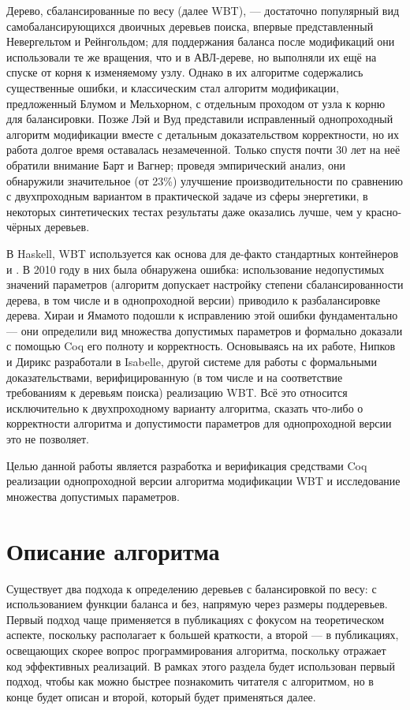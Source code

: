 \documentclass[a4paper,14pt]{extarticle}
\begin{document}
Дерево, сбалансированные по весу (далее WBT), --- достаточно популярный вид
самобалансирующихся двоичных деревьев поиска,
впервые представленный Невергельтом и Рейнгольдом\cite{nievergelt};
для поддержания баланса после модификаций они использовали
те же вращения, что и в АВЛ-дереве\cite{avl},
но выполняли их ещё на спуске от корня к изменяемому узлу.
Однако в их алгоритме содержались существенные ошибки,
и классическим стал алгоритм модификации,
предложенный Блумом и Мельхорном\cite{blum},
с отдельным проходом от узла к корню для балансировки.
Позже Лэй и Вуд представили исправленный
однопроходный алгоритм модификации
вместе с детальным доказательством корректности\cite{lai},
но их работа долгое время оставалась незамеченной.
Только спустя почти 30 лет на неё обратили внимание
Барт и Вагнер;
проведя эмпирический анализ, они обнаружили
значительное (от 23\%) улучшение производительности
по сравнению с двухпроходным вариантом в практической задаче из сферы энергетики,
в некоторых синтетических тестах
результаты даже оказались лучше, чем у красно-чёрных деревьев\cite{barth}.

В Haskell, WBT используется как основа для
де-факто стандартных контейнеров  и .
В 2010 году в них была обнаружена ошибка:
использование недопустимых значений параметров
(алгоритм допускает настройку степени сбалансированности дерева,
в том числе и в однопроходной версии)
приводило к разбалансировке дерева.
Хираи и Ямамото подошли к исправлению этой ошибки фундаментально ---
они определили вид множества допустимых параметров
и формально доказали с помощью Coq его полноту и корректность\cite{hirai}.
Основываясь на их работе,
Нипков и Дирикс разработали в Isabelle,
другой системе для работы с формальными доказательствами,
верифицированную (в том числе и на соответствие требованиям к деревьям поиска)
реализацию WBT\cite{nipkow}.
Всё это относится исключительно
к двухпроходному варианту алгоритма,
сказать что-либо о корректности алгоритма и допустимости параметров
для однопроходной версии это не позволяет.

Целью данной работы является
разработка и верификация средствами Coq
реализации однопроходной версии алгоритма модификации WBT
и исследование множества допустимых параметров.

\clearpage
\section{Описание алгоритма}

Существует два подхода
к определению деревьев с балансировкой по весу:
с использованием функции баланса и
без, напрямую через размеры поддеревьев.
Первый подход чаще
применяется в публикациях с фокусом на теоретическом аспекте,
поскольку располагает к большей краткости,
а второй --- в публикациях,
освещающих скорее вопрос программирования алгоритма,
поскольку отражает код эффективных реализаций.
В рамках этого раздела
будет использован первый подход,
чтобы как можно быстрее познакомить читателя с алгоритмом,
но в конце будет описан и второй,
который будет применяться далее.
\end{document}
